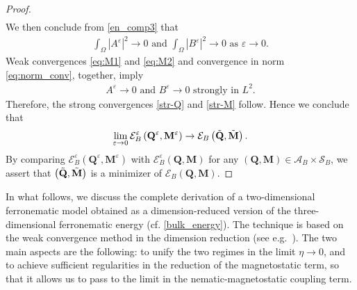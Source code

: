 \documentclass{article}
\newtheorem{remark}[theorem]{Remark}
\def\Qvec{\mathbf{Q}}
\def \Mvec{\mathbf{M}}
\def\Hvec{\mathbf{H}}
\begin{document}
\begin{proof}
\begin{eqnarray}
\end{eqnarray}
We then conclude from \eqref{en_comp3} that
\begin{eqnarray}
\int_{\Omega}|A^{\varepsilon}|^2 \rightarrow 0 \mbox{ and }\int_{\Omega}|B^{\varepsilon}|^2 \rightarrow 0 \mbox{ as } \varepsilon\rightarrow 0.\label{eq:norm_conv}
\end{eqnarray}
Weak convergences \eqref{eq:M1} and \eqref{eq:M2} and convergence in norm \eqref{eq:norm_conv}, together, imply
\begin{eqnarray}
A^{\varepsilon}\rightarrow 0 \mbox{ and }B^{\varepsilon}\rightarrow 0 \mbox{ strongly in } L^2.
\end{eqnarray}
Therefore, the strong convergences \eqref{str-Q} and \eqref{str-M} follow.
Hence we conclude that 
\begin{eqnarray}
\lim_{\varepsilon\rightarrow 0}\mathcal{E}^{\varepsilon}_B\left(\Qvec^{\varepsilon}, \Mvec^{\varepsilon}\right)\rightarrow \mathcal{E}_B\left(\Tilde{\Qvec}, \Tilde{\Mvec}\right).
\end{eqnarray}
By comparing $\mathcal{E}^{\varepsilon}_B\left(\Qvec^{\varepsilon}, \Mvec^{\varepsilon}\right)$ with $\mathcal{E}^{\varepsilon}_B\left(\Qvec, \Mvec\right)$ for any $\left(\Qvec, \Mvec\right)\in\mathcal{A}_B\times\mathcal{S}_B$, we assert that $\left(\Tilde{\Qvec}, \Tilde{\Mvec}\right)$ is a minimizer of $\mathcal{E}_B\left(\Qvec, \Mvec\right)$.
\end{proof}
In what follows, we discuss the complete derivation of a two-dimensional ferronematic model obtained as a dimension-reduced version of the three-dimensional ferronematic energy (cf. \eqref{bulk_energy}). The technique is based on the weak convergence method in the dimension reduction (see e.g.\ \cite{braides2002gamma}). The two main aspects are the following: to unify the two regimes in the limit $\eta\rightarrow 0$, and to achieve sufficient regularities in the reduction of the magnetostatic term, so that it allows us to pass to the limit in the nematic-magnetostatic coupling term.
\end{document}
